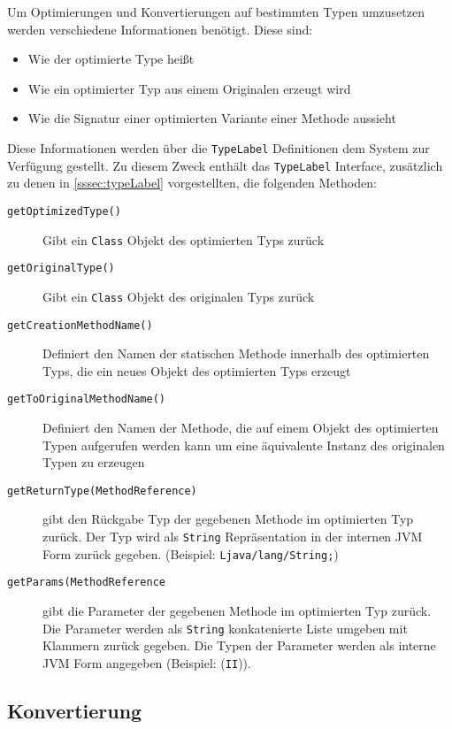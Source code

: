 Um Optimierungen und Konvertierungen auf bestimmten Typen umzusetzen werden verschiedene 
Informationen benötigt. Diese sind:

\begin{itemize}
	\item Wie der optimierte Type heißt
	\item Wie ein optimierter Typ aus einem Originalen erzeugt wird
	\item Wie die Signatur einer optimierten Variante einer Methode aussieht
\end{itemize} 


Diese Informationen werden über die \texttt{TypeLabel} Definitionen dem System zur Verfügung gestellt.
Zu diesem Zweck enthält das \texttt{TypeLabel} Interface, zusätzlich zu denen in \ref{sssec:typeLabel} 
vorgestellten, die folgenden Methoden: 

\begin{description}
	\item[\texttt{getOptimizedType()}] Gibt ein \texttt{Class} Objekt des optimierten Typs zurück
	\item[\texttt{getOriginalType()}] Gibt ein \texttt{Class} Objekt des originalen Typs zurück
	\item[\texttt{getCreationMethodName()}] Definiert den Namen der statischen Methode innerhalb des
	optimierten Typs, die ein neues Objekt des optimierten Typs erzeugt
	\item[\texttt{getToOriginalMethodName()}] Definiert den Namen der Methode, die auf einem Objekt
	des optimierten Typen aufgerufen werden kann um eine äquivalente Instanz des originalen Typen
	zu erzeugen
	\item[\texttt{getReturnType(MethodReference)}] gibt den Rückgabe Typ der gegebenen Methode im optimierten
	Typ zurück. Der Typ wird als \texttt{String} Repräsentation in der internen JVM Form zurück gegeben.
	(Beispiel: \texttt{Ljava/lang/String;})
	\item[\texttt{getParams(MethodReference}] gibt die Parameter der gegebenen Methode im optimierten
	Typ zurück. Die Parameter werden als \texttt{String} konkatenierte Liste umgeben mit Klammern 
	zurück gegeben. Die Typen der Parameter werden als interne JVM Form angegeben (Beispiel: (\texttt{II})).
\end{description}

\subsection{Konvertierung}

